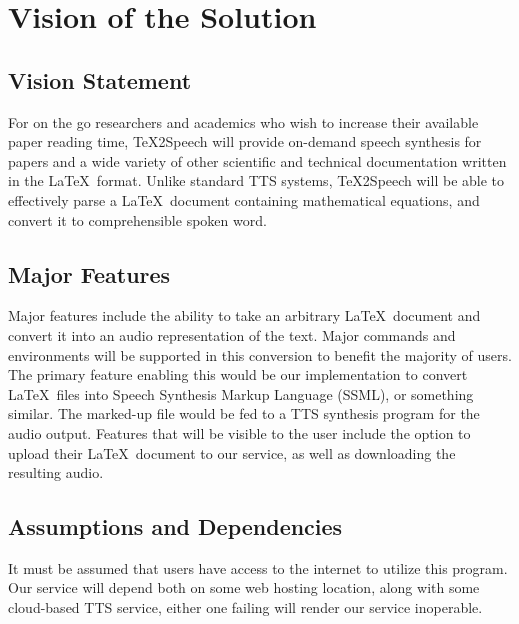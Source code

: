 \section{Vision of the Solution}
\subsection{Vision Statement}
%
For on the go researchers and academics who wish to increase their available paper reading time, \TeX 2Speech will provide on-demand speech synthesis for papers and a wide variety of other scientific and technical documentation written in the \LaTeX\ format. Unlike standard TTS systems, \TeX 2Speech will be able to effectively parse a \LaTeX\ document containing mathematical equations, and convert it to comprehensible spoken word.

\subsection{Major Features}
Major features include the ability to take an arbitrary \LaTeX\ document and convert it into an audio representation of the text. Major commands and environments will be supported in this conversion to benefit the majority of users. The primary feature enabling this would be our implementation to convert \LaTeX\ files into Speech Synthesis Markup Language (SSML), or something similar. The marked-up file would be fed to a TTS synthesis program for the audio output. Features that will be visible to the user include the option to upload their \LaTeX\ document to our service, as well as downloading the resulting audio. 

\subsection{Assumptions and Dependencies}
It must be assumed that users have access to the internet to utilize this program. Our service will depend both on some web hosting location, along with some cloud-based TTS service, either one failing will render our service inoperable.
